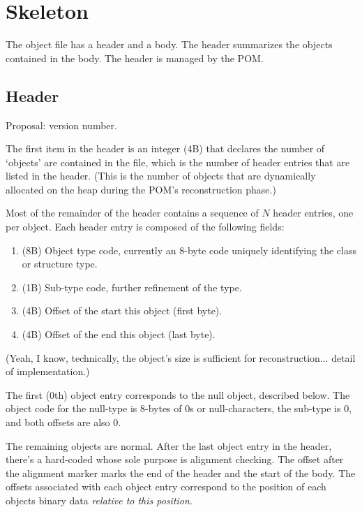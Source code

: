 
\chapter{Skeleton}
\label{sec:skeleton}

The object file has a header and a body.  
The header summarizes the objects contained in the body.  
The header is managed by the POM.  

\section{Header}
\label{sec:skeleton:header}

Proposal: version number.  

The first item in the header is an integer (4B) that declares the
number of `objects' are contained in the file, which is the number
of header entries that are listed in the header.  
(This is the number of objects that are dynamically allocated on the heap
during the POM's reconstruction phase.)

Most of the remainder of the header contains a sequence of $N$ header entries, 
one per object.  
Each header entry is composed of the following fields:

\begin{enumerate}
\item (8B) Object type code, currently an 8-byte code uniquely identifying
	the class or structure type.  
\item (1B) Sub-type code, further refinement of the type.  
\item (4B) Offset of the start this object (first byte).
\item (4B) Offset of the end this object (last byte).
\end{enumerate}

(Yeah, I know, technically, the object's size is sufficient 
for reconstruction... detail of implementation.)

The first (0th) object entry corresponds to the null object, described below.  
The object code for the null-type is 8-bytes of $0$s or null-characters, 
the sub-type is $0$, and both offsets are also $0$.  

The remaining objects are normal.  
After the last object entry in the header, 
there's a hard-coded  whose sole purpose is alignment checking.  
The offset after the alignment marker marks the end of the header
and the start of the body.  
The offsets associated with each object entry correspond to the 
position of each objects binary data \emph{relative to this position}.  

